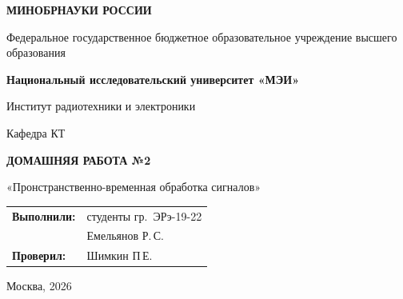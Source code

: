 \begin{titlepage}
    \centering
    {\bfseries МИНОБРНАУКИ РОССИИ\par}
    Федеральное государственное бюджетное образовательное учреждение высшего образования \\
    {\bfseries Национальный исследовательский университет «МЭИ»\par}
    \vspace{1cm}
    Институт радиотехники и электроники\par
    Кафедра КТ\par
    \vspace{3cm}
    
    {\bfseries\large ДОМАШНЯЯ РАБОТА №2\par}
    \vspace{0.5cm}
    {\large «Пронстранственно-временная обработка сигналов»\par}
    
    \vspace{3.5cm}
 \vspace{1.5cm}
\noindent\hfill
\begin{tabular}{@{}ll@{}}
    \textbf{Выполнили:} & студенты гр.~ЭРэ-19-22 \\
                        & Емельянов Р.\,С. \\
    \textbf{Проверил:}  & Шимкин П\,Е.
\end{tabular}   
    \vfill
    {Москва, 2026}
\end{titlepage}
